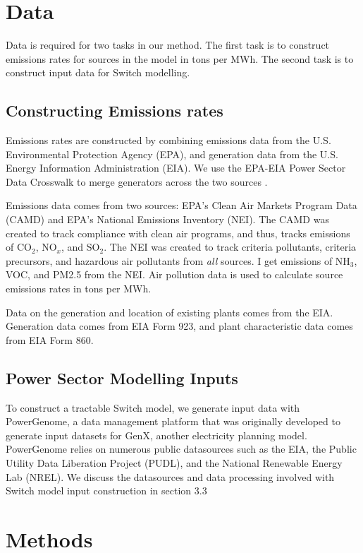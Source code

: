 \documentclass[a4paper]{article}
\theoremstyle{definition}
\theoremstyle{plain}
\begin{document}
\section{Data}
Data is required for two tasks in our method. The first task is to construct emissions rates for sources in the model in tons per MWh. The second task is to construct input data for Switch modelling.


\subsection{Constructing Emissions rates}
Emissions rates are constructed by combining emissions data from the U.S. Environmental Protection Agency (EPA), and generation data from the U.S. Energy Information Administration (EIA). We use the EPA-EIA Power Sector Data Crosswalk to merge generators across the two sources \citep{HuettemanEPA-EIACrosswalk}.

Emissions data comes from two sources: EPA's Clean Air Markets Program Data (CAMD) and EPA's National Emissions Inventory (NEI).  The CAMD was created to track compliance with clean air programs, and thus, tracks emissions of CO$_2$, NO$_x$, and SO$_2$.  The NEI was created to track criteria pollutants, criteria precursors, and hazardous air pollutants from \textit{all} sources.  I get emissions of NH$_3$, VOC, and PM2.5 from the NEI.  Air pollution data is used to calculate source emissions rates in tons per MWh.

Data on the generation and location of existing plants comes from the EIA. Generation data comes from EIA Form 923, and plant characteristic data comes from EIA Form 860.


\subsection{Power Sector Modelling Inputs}
To construct a tractable Switch model, we generate input data with PowerGenome, a data management platform that was originally developed to generate input datasets for GenX, another electricity planning model. PowerGenome relies on numerous public datasources such as the EIA, the Public Utility Data Liberation Project (PUDL), and the National Renewable Energy Lab (NREL). We discuss the datasources and data processing involved with Switch model input construction in section 3.3

\section{Methods}
\end{document}
